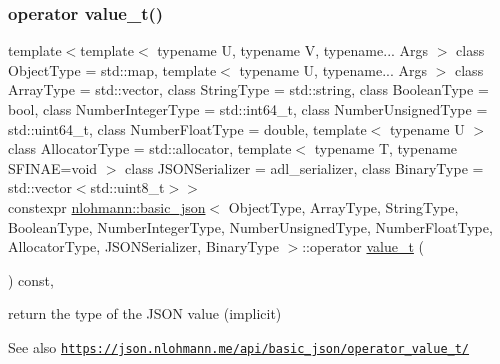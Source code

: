 \subsubsection{\texorpdfstring{operator value\+\_\+t()}{operator value\_t()}}
{\footnotesize\ttfamily template$<$template$<$ typename U, typename V, typename... Args $>$ class Object\+Type = std\+::map, template$<$ typename U, typename... Args $>$ class Array\+Type = std\+::vector, class String\+Type  = std\+::string, class Boolean\+Type  = bool, class Number\+Integer\+Type  = std\+::int64\+\_\+t, class Number\+Unsigned\+Type  = std\+::uint64\+\_\+t, class Number\+Float\+Type  = double, template$<$ typename U $>$ class Allocator\+Type = std\+::allocator, template$<$ typename T, typename S\+F\+I\+N\+A\+E=void $>$ class J\+S\+O\+N\+Serializer = adl\+\_\+serializer, class Binary\+Type  = std\+::vector$<$std\+::uint8\+\_\+t$>$$>$ \\
constexpr \hyperlink{classnlohmann_1_1basic__json}{nlohmann\+::basic\+\_\+json}$<$ Object\+Type, Array\+Type, String\+Type, Boolean\+Type, Number\+Integer\+Type, Number\+Unsigned\+Type, Number\+Float\+Type, Allocator\+Type, J\+S\+O\+N\+Serializer, Binary\+Type $>$\+::operator \hyperlink{namespacenlohmann_1_1detail_a1ed8fc6239da25abcaf681d30ace4985}{value\+\_\+t} (\begin{DoxyParamCaption}{ }\end{DoxyParamCaption}) const\hspace{0.3cm}{\ttfamily [inline]}, {\ttfamily [noexcept]}}



return the type of the J\+S\+ON value (implicit) 

\begin{DoxySeeAlso}{See also}
\href{https://json.nlohmann.me/api/basic_json/operator_value_t/}{\tt https\+://json.\+nlohmann.\+me/api/basic\+\_\+json/operator\+\_\+value\+\_\+t/} 
\end{DoxySeeAlso}
\mbox{\label{classnlohmann_1_1basic__json_ada1463d8d7ba77865f28f5e83dec7f33}} 
